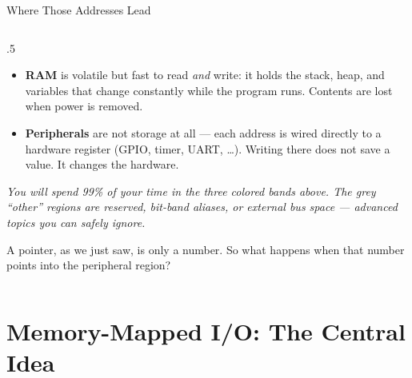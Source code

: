 \documentclass[9pt,aspectratio=169,xcolor=table]{beamer}
\begin{document}
\begin{frame}{Where Those Addresses Lead}
\begin{columns}[c]
\begin{column}{.5\textwidth}
{\begin{itemize}
					\item \textbf{RAM} is \alert{volatile} but fast to read
					\emph{and} write: it holds the stack, heap, and variables
					that change constantly while the program runs. Contents
					are lost when power is removed.

					\item \textbf{Peripherals} are not storage at all --- each
					address is wired directly to a hardware register (GPIO,
					timer, UART, \ldots). Writing there does not save a value.
					It \alert{changes the hardware}.
				\end{itemize}

				\vspace{1mm}
				{\footnotesize\itshape You will spend 99\% of your time
				in the three colored bands above. The grey ``other''
				regions are reserved, bit-band aliases, or external bus
				space --- advanced topics you can safely ignore.}

				\vspace{1mm}
				A pointer, as we just saw, is only a number. So what
				happens when that number points into the peripheral
				region?
			}
		\end{column}
	\end{columns}
\end{frame}


\section{Memory-Mapped I/O: The Central Idea}
\end{document}
